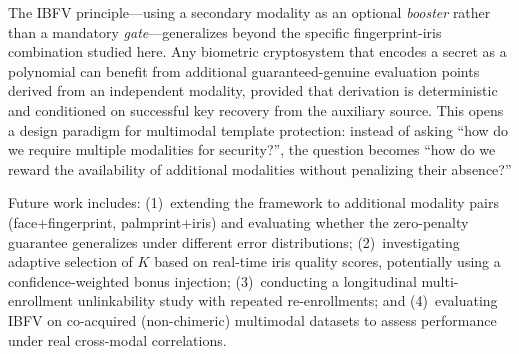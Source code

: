 \documentclass[3p,twocolumn]{elsarticle}
\newcommand{\IBFV}{\textsf{IBFV}}
\begin{document}
The \IBFV{} principle---using a secondary modality as an optional \emph{booster} rather than a mandatory \emph{gate}---generalizes beyond the specific fingerprint-iris combination studied here. Any biometric cryptosystem that encodes a secret as a polynomial can benefit from additional guaranteed-genuine evaluation points derived from an independent modality, provided that derivation is deterministic and conditioned on successful key recovery from the auxiliary source. This opens a design paradigm for multimodal template protection: instead of asking ``how do we require multiple modalities for security?'', the question becomes ``how do we reward the availability of additional modalities without penalizing their absence?''

Future work includes: (1)~extending the framework to additional modality pairs (face+fingerprint, palmprint+iris) and evaluating whether the zero-penalty guarantee generalizes under different error distributions; (2)~investigating adaptive selection of $K$ based on real-time iris quality scores, potentially using a confidence-weighted bonus injection; (3)~conducting a longitudinal multi-enrollment unlinkability study with repeated re-enrollments; and (4)~evaluating \IBFV{} on co-acquired (non-chimeric) multimodal datasets to assess performance under real cross-modal correlations.



\end{document}
